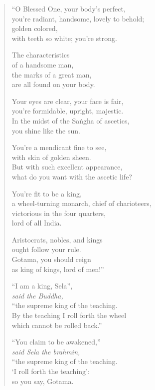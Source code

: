 \documentclass[12pt,openany]{book}%
\newcommand*{\scspeaker}[1]{\hspace{2em}\textit{#1}}
\begin{document}
\begin{verse}%
“O Blessed One, your body’s perfect, \\
you’re radiant, handsome, lovely to behold; \\
golden colored, \\
with teeth so white; you’re strong. 

The characteristics \\
of a handsome man, \\
the marks of a great man, \\
are all found on your body. 

Your eyes are clear, your face is fair, \\
you’re formidable, upright, majestic. \\
In the midst of the \textsanskrit{Saṅgha} of ascetics, \\
you shine like the sun. 

You’re a mendicant fine to see, \\
with skin of golden sheen. \\
But with such excellent appearance, \\
what do you want with the ascetic life? 

You’re fit to be a king, \\
a wheel-turning monarch, chief of charioteers, \\
victorious in the four quarters, \\
lord of all India. 

Aristocrats, nobles, and kings \\
ought follow your rule. \\
Gotama, you should reign \\
as king of kings, lord of men!” 

“I am a king, Sela”, \\
\scspeaker{said the Buddha, }\\
“the supreme king of the teaching. \\
By the teaching I roll forth the wheel \\
which cannot be rolled back.” 

“You claim to be awakened,” \\
\scspeaker{said Sela the brahmin, }\\
“the supreme king of the teaching. \\
‘I roll forth the teaching’: \\
so you say, Gotama. 


\end{verse}
\end{document}
